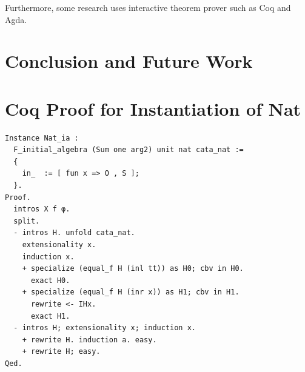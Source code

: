 \documentclass[runningheads, orivec]{llncs}
\begin{document}
Furthermore, some research\cite{} uses interactive theorem prover such as Coq and Agda. 

\section{Conclusion and Future Work}





%
%
%


%

\appendix
\section{Coq Proof for Instantiation of Nat}

{\small
\begin{verbatim}
Instance Nat_ia :
  F_initial_algebra (Sum one arg2) unit nat cata_nat :=
  {
    in_  := [ fun x => O , S ];
  }.
Proof.
  intros X f φ.
  split.
  - intros H. unfold cata_nat.
    extensionality x.
    induction x.
    + specialize (equal_f H (inl tt)) as H0; cbv in H0.
      exact H0.
    + specialize (equal_f H (inr x)) as H1; cbv in H1.
      rewrite <- IHx.
      exact H1.
  - intros H; extensionality x; induction x.
    + rewrite H. induction a. easy.
    + rewrite H; easy.
Qed.
\end{verbatim}
}
\end{document}

